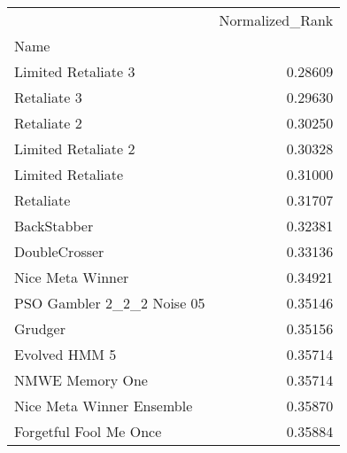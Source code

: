 \begin{tabular}{lr}
\toprule
{} &  Normalized\_Rank \\
Name                       &                  \\
\midrule
Limited Retaliate 3        &          0.28609 \\
Retaliate 3                &          0.29630 \\
Retaliate 2                &          0.30250 \\
Limited Retaliate 2        &          0.30328 \\
Limited Retaliate          &          0.31000 \\
Retaliate                  &          0.31707 \\
BackStabber                &          0.32381 \\
DoubleCrosser              &          0.33136 \\
Nice Meta Winner           &          0.34921 \\
PSO Gambler 2\_2\_2 Noise 05 &          0.35146 \\
Grudger                    &          0.35156 \\
Evolved HMM 5              &          0.35714 \\
NMWE Memory One            &          0.35714 \\
Nice Meta Winner Ensemble  &          0.35870 \\
Forgetful Fool Me Once     &          0.35884 \\
\bottomrule
\end{tabular}
